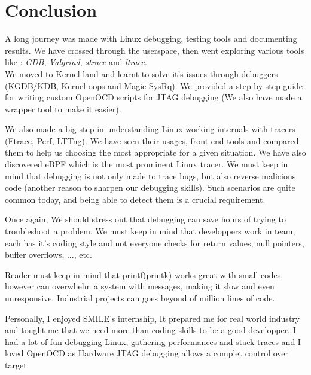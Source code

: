 \section{Conclusion}
 A long journey was made with Linux debugging, testing tools and documenting results. We have crossed through the userspace, then went exploring various tools like : \emph{GDB}, \emph{Valgrind}, \emph{strace} and \emph{ltrace}.\\

We moved to Kernel-land and learnt to solve it's issues through debuggers (KGDB/KDB, Kernel oops and Magic SysRq). We provided a step by step guide for writing custom OpenOCD scripts for JTAG debugging (We also have made a wrapper tool to make it easier). 

We also made a big step in understanding Linux working internals with tracers (Ftrace, Perf, LTTng). We have seen their usages, front-end tools and compared them to help us choosing the most appropriate for a given situation. We have also discovered eBPF which is the most prominent Linux tracer.
\vspace{10px}
We must keep in mind that debugging is not only made to trace bugs, but also reverse malicious code (another reason to sharpen our debugging skills). Such scenarios are quite common today, and being able to detect them is a crucial requirement.

\vspace{5px}
Once again, We should stress out that debugging can save hours of trying to troubleshoot a problem. We must keep in mind that developpers work in team, each has it's coding style and not everyone checks for return values, null pointers, buffer overflows, ..., etc.



\vspace{7px}
Reader must keep in mind that printf(printk) works great with small codes, however can overwhelm a system with messages, making it slow and even unresponsive. Industrial projects can goes beyond of million lines of code.\\



\begin{center}
\color{red}
Personally, I enjoyed SMILE's internship, It prepared me for real world industry and tought me that we need more than coding skills to be a good developper.  I had a lot of fun debugging Linux, gathering performances and stack traces and I loved OpenOCD as Hardware JTAG debugging allows a complet control over target.
\end{center}



